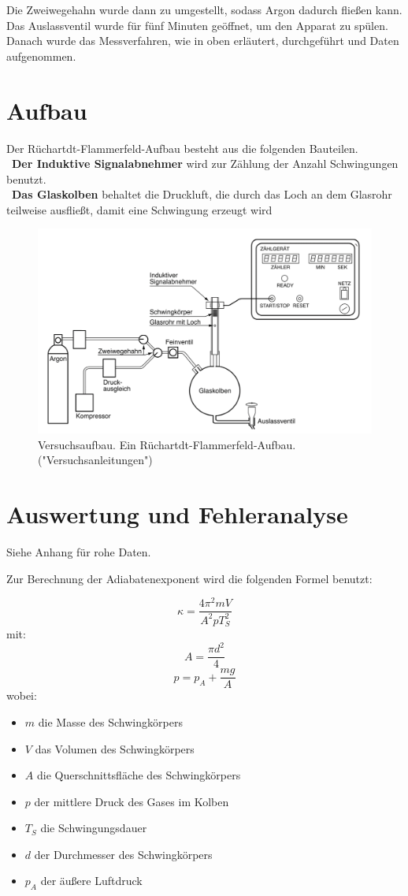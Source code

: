 \documentclass[11pt,a4paper]{article} %
\begin{document}
Die Zweiwegehahn wurde dann zu umgestellt, sodass Argon dadurch fließen kann. Das Auslassventil wurde für fünf Minuten geöffnet, um den Apparat zu spülen. Danach wurde das Messverfahren, wie in oben erläutert, durchgeführt und Daten aufgenommen. 
\section{Aufbau}
Der Rüchartdt-Flammerfeld-Aufbau besteht aus die folgenden Bauteilen.
\\\ 
\textbf{Der Induktive Signalabnehmer} wird zur Zählung der Anzahl Schwingungen benutzt. 
\\\
\textbf{Das Glaskolben} behaltet die Druckluft, die durch das Loch an dem Glasrohr teilweise ausfließt, damit eine Schwingung erzeugt wird
\begin{figure} [h]
\centering
\includegraphics[width=\linewidth]{Abb1}
\caption{Versuchsaufbau. Ein Rüchartdt-Flammerfeld-Aufbau. ("Versuchsanleitungen")}
\end{figure}

\section{Auswertung und Fehleranalyse}
Siehe Anhang für rohe Daten.

Zur Berechnung der Adiabatenexponent wird die folgenden Formel benutzt:

\begin{equation}
\kappa = \frac{4\pi^2 m V}{A^2 p T_S^2}
\end{equation}
mit:
$$ A = \frac{\pi d^2}{4} $$
$$ p = p_A + \frac{mg}{A} $$
wobei:

\begin{itemize}
	\item $m$ die Masse des Schwingkörpers
	\item $V$ das Volumen des Schwingkörpers
	\item $A$ die Querschnittsfläche des Schwingkörpers
	\item $p$ der mittlere Druck des Gases im Kolben
	\item $T_S$ die Schwingungsdauer
	\item $d$ der Durchmesser des Schwingkörpers
	\item $p_A$ der äußere Luftdruck 
\end{itemize}
\end{document}
